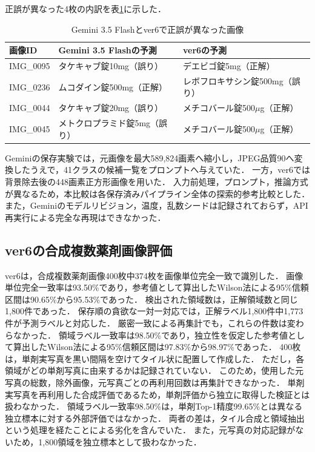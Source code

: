 \documentclass[uplatex,dvipdfmx]{jsarticle}
\begin{document}
正誤が異なった4枚の内訳を表\ref{tab:discordant_gemini_ver6}に示した．

\begin{table}[htbp]
  \centering
  \caption{Gemini 3.5 Flashとver6で正誤が異なった画像}
  \label{tab:discordant_gemini_ver6}
  \scriptsize
  \begin{tabular}{|p{1.8cm}|p{4.2cm}|p{4.2cm}|}
    \hline
    画像ID & Gemini 3.5 Flashの予測 & ver6の予測 \\ \hline
    IMG\_0095 & タケキャブ錠10mg（誤り） & デエビゴ錠5mg（正解） \\ \hline
    IMG\_0236 & ムコダイン錠500mg（正解） & レボフロキサシン錠500mg（誤り） \\ \hline
    IMG\_0044 & タケキャブ錠20mg（誤り） & メチコバール錠500$\mu$g（正解） \\ \hline
    IMG\_0045 & メトクロプラミド錠5mg（誤り） & メチコバール錠500$\mu$g（正解） \\ \hline
  \end{tabular}
\end{table}

Geminiの保存実験では，元画像を最大589,824画素へ縮小し，JPEG品質90へ変換したうえで，41クラスの候補一覧をプロンプトへ与えていた．
一方，ver6では背景除去後の448画素正方形画像を用いた．
入力前処理，プロンプト，推論方式が異なるため，本比較は各保存済みパイプライン全体の探索的参考比較とした．
また，Geminiのモデルリビジョン，温度，乱数シードは記録されておらず，API再実行による完全な再現はできなかった．

\subsection{ver6の合成複数薬剤画像評価}\label{sec:ver6_multi}

ver6は，合成複数薬剤画像400枚中374枚を画像単位完全一致で識別した．
画像単位完全一致率は93.50\%であり，参考値として算出したWilson法による95\%信頼区間は90.65\%から95.53\%であった．
検出された領域数は，正解領域数と同じ1,800件であった．
保存順の貪欲な一対一対応では，正解ラベル1,800件中1,773件が予測ラベルと対応した．
厳密一致による再集計でも，これらの件数は変わらなかった．
領域ラベル一致率は98.50\%であり，独立性を仮定した参考値として算出したWilson法による95\%信頼区間は97.83\%から98.97\%であった．
400枚は，単剤実写真を黒い間隔を空けてタイル状に配置して作成した．
ただし，各領域がどの単剤写真に由来するかは記録されていない．
このため，使用した元写真の総数，除外画像，元写真ごとの再利用回数は再集計できなかった．
単剤実写真を再利用した合成評価であるため，単剤評価から独立に取得した検証とは扱わなかった．
領域ラベル一致率98.50\%は，単剤Top-1精度99.65\%とは異なる独立標本に対する外部評価ではなかった．
両者の差は，タイル合成と領域抽出という処理を経たことによる劣化を含んでいた．
また，元写真の対応記録がないため，1,800領域を独立標本として扱わなかった．
\end{document}
